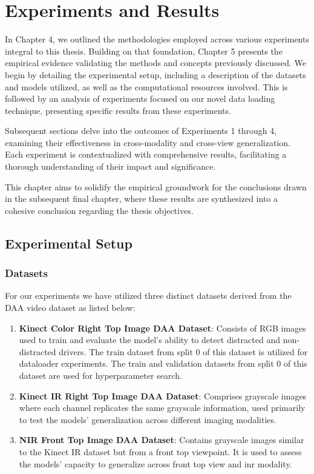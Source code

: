 \chapter{Experiments and Results}
\label{chapter:Experiments and Results}
In Chapter 4, we outlined the methodologies employed across various experiments integral to this thesis. Building on that foundation, Chapter 5 presents the empirical evidence validating the methods and concepts previously discussed. We begin by detailing the experimental setup, including a description of the datasets and models utilized, as well as the computational resources involved. This is followed by an analysis of experiments focused on our novel data loading technique, presenting specific results from these experiments.

Subsequent sections delve into the outcomes of Experiments 1 through 4, examining their effectiveness in cross-modality and cross-view generalization. Each experiment is contextualized with comprehensive results, facilitating a thorough understanding of their impact and significance.

This chapter aims to solidify the empirical groundwork for the conclusions drawn in the subsequent final chapter, where these results are synthesized into a cohesive conclusion regarding the thesis objectives.

\section{Experimental Setup}
\subsection{Datasets}
For our experiments we have utilized three distinct datasets derived from the DAA video dataset as listed below:
\begin{enumerate}
    \item \textbf{Kinect Color Right Top Image DAA Dataset}: Consists of RGB images used to train and evaluate the model’s ability to detect distracted and non-distracted drivers. The train dataset from split 0 of this dataset is utilized for dataloader experiments. The train and validation datasets from split 0 of this dataset are used for hyperparameter search.
    \item \textbf{Kinect IR Right Top Image DAA Dataset}: Comprises grayscale images where each channel replicates the same grayscale information, used primarily to test the models' generalization across different imaging modalities.
    \item \textbf{NIR Front Top Image DAA Dataset}: Contains grayscale images similar to the Kinect IR dataset but from a front top viewpoint. It is used to assess the models' capacity to generalize across front top view and \gls{inr} modality.
\end{enumerate}

